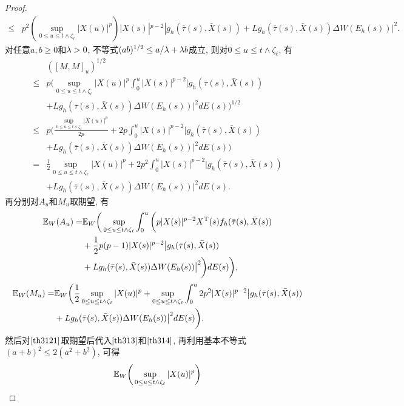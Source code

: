\begin{proof}
\begin{align*}
    \leq& p^2\left(\sup_{0\leq u\leq t\wedge \zeta_{\ell}}|X(u)|^p\right)\big|X(s)|^{p-2}|g_{h}(\bar{\tau}(s),\bar{X}(s))+Lg_{h}(\bar{\tau}(s),\bar{X}(s))\Delta W(E_{h}(s))\big|^2.
\end{align*}
对任意$a,b\geq 0$和$\lambda > 0$, 不等式$(ab)^{1/2}\leq a/\lambda +\lambda b$成立, 则对$0\leq u \leq t\wedge \zeta_{\ell}$, 有
    \begin{align*}
    &([M,M]_u)^{1/2}\\
    \leq& p\bigg(\sup_{0\leq u\leq t\wedge \zeta_{\ell}}|X(u)|^p\int_{0}^{u}|X(s)|^{p-2}\big|g_{h}(\bar{\tau}(s),\bar{X}(s))\\
    &+Lg_{h}(\bar{\tau}(s),\bar{X}(s))\Delta W(E_{h}(s))\big|^2 dE(s)\bigg)^{1/2}\\
    \leq& p\bigg(\frac{\sup_{0\leq u\leq t\wedge \zeta_{\ell}}|X(u)|^p}{2p}+2p\int_{0}^{u}|X(s)|^{p-2}\big|g_{h}(\bar{\tau}(s),\bar{X}(s))\\
    &+Lg_{h}(\bar{\tau}(s),\bar{X}(s))\Delta W(E_{h}(s))\big|^2 dE(s)\bigg)\\
    = & \frac{1}{2}\sup_{0\leq u\leq t\wedge\zeta_{\ell}}|X(u)|^p +2p^2\int_{0}^{u}|X(s)|^{p-2}\big|g_{h}(\bar{\tau}(s),\bar{X}(s))\\
    &+Lg_{h}(\bar{\tau}(s),\bar{X}(s))\Delta W(E_{h}(s))\big|^2 dE(s).
\end{align*}
 再分别对$A_u$和$M_u$取期望, 有
  \begin{align}
      \label{th313}
     \mathbb{E}_W(A_u)=&\mathbb{E}_W\bigg(\sup_{0\leq u\leq t\wedge \zeta_{\ell}}\int_{0}^{u}\bigg(p|X(s)|^{p-2}X^{\mathrm{T}}(s)f_{h}(\bar{\tau}(s),\bar{X}(s))\nonumber\\ &+\frac{1}{2}p(p-1)|X(s)|^{p-2}\big|g_{h}(\bar{\tau}(s),\bar{X}(s))\nonumber\\
     &+Lg_{h}(\bar{\tau}(s),\bar{X}(s))\Delta W(E_{h}(s))\big|^2\bigg) dE(s)\bigg),
 \end{align}
 \begin{align}
     \label{th314}
     \mathbb{E}_W(M_u)=&\mathbb{E}_W\bigg(\frac{1}{2}\sup_{0\leq u\leq t\wedge\zeta_{\ell}}|X(u)|^p+\sup_{0\leq u\leq t\wedge\zeta_{\ell}}\int_{0}^{u}2p^2|X(s)|^{p-2}\big|g_{h}(\bar{\tau}(s),\bar{X}(s))  \nonumber\\ 
     &+Lg_{h}(\bar{\tau}(s),\bar{X}(s))\Delta W(E_{h}(s))\big|^2 dE(s)\bigg).
 \end{align}
然后对$\eqref{th3121}$取期望后代入$\eqref{th313}$和$\eqref{th314}$, 再利用基本不等式$(a+b)^{2}\leq2(a^{2}+b^{2})$, 可得
\begin{align}
    \label{th315}
    &\EE_W\bigg(\sup_{0\leq u\leq t\wedge \zeta_{\ell}}|X(u)|^p\bigg)  \nonumber\\ 

\end{align}
\end{proof}
